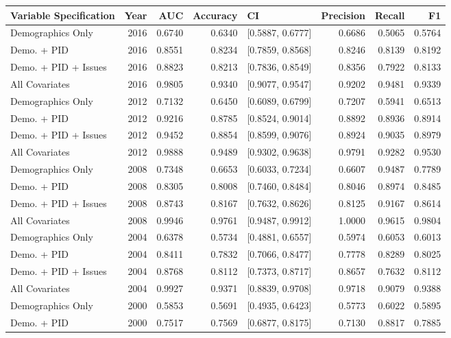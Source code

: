 \begin{longtable}{lrrrlrrr}
  \toprule
Variable Specification & Year & AUC & Accuracy & CI & Precision & Recall & F1 \\ 
  \midrule
Demographics Only & 2016 & 0.6740 & 0.6340 & [0.5887, 0.6777] & 0.6686 & 0.5065 & 0.5764 \\ 
  Demo. + PID & 2016 & 0.8551 & 0.8234 & [0.7859, 0.8568] & 0.8246 & 0.8139 & 0.8192 \\ 
  Demo. + PID + Issues & 2016 & 0.8823 & 0.8213 & [0.7836, 0.8549] & 0.8356 & 0.7922 & 0.8133 \\ 
  All Covariates & 2016 & 0.9805 & 0.9340 & [0.9077, 0.9547] & 0.9202 & 0.9481 & 0.9339 \\ 
  Demographics Only & 2012 & 0.7132 & 0.6450 & [0.6089, 0.6799] & 0.7207 & 0.5941 & 0.6513 \\ 
  Demo. + PID & 2012 & 0.9216 & 0.8785 & [0.8524, 0.9014] & 0.8892 & 0.8936 & 0.8914 \\ 
  Demo. + PID + Issues & 2012 & 0.9452 & 0.8854 & [0.8599, 0.9076] & 0.8924 & 0.9035 & 0.8979 \\ 
  All Covariates & 2012 & 0.9888 & 0.9489 & [0.9302, 0.9638] & 0.9791 & 0.9282 & 0.9530 \\ 
  Demographics Only & 2008 & 0.7348 & 0.6653 & [0.6033, 0.7234] & 0.6607 & 0.9487 & 0.7789 \\ 
  Demo. + PID & 2008 & 0.8305 & 0.8008 & [0.7460, 0.8484] & 0.8046 & 0.8974 & 0.8485 \\ 
  Demo. + PID + Issues & 2008 & 0.8743 & 0.8167 & [0.7632, 0.8626] & 0.8125 & 0.9167 & 0.8614 \\ 
  All Covariates & 2008 & 0.9946 & 0.9761 & [0.9487, 0.9912] & 1.0000 & 0.9615 & 0.9804 \\ 
  Demographics Only & 2004 & 0.6378 & 0.5734 & [0.4881, 0.6557] & 0.5974 & 0.6053 & 0.6013 \\ 
  Demo. + PID & 2004 & 0.8411 & 0.7832 & [0.7066, 0.8477] & 0.7778 & 0.8289 & 0.8025 \\ 
  Demo. + PID + Issues & 2004 & 0.8768 & 0.8112 & [0.7373, 0.8717] & 0.8657 & 0.7632 & 0.8112 \\ 
  All Covariates & 2004 & 0.9927 & 0.9371 & [0.8839, 0.9708] & 0.9718 & 0.9079 & 0.9388 \\ 
  Demographics Only & 2000 & 0.5853 & 0.5691 & [0.4935, 0.6423] & 0.5773 & 0.6022 & 0.5895 \\ 
  Demo. + PID & 2000 & 0.7517 & 0.7569 & [0.6877, 0.8175] & 0.7130 & 0.8817 & 0.7885 \\ 

\end{longtable}
